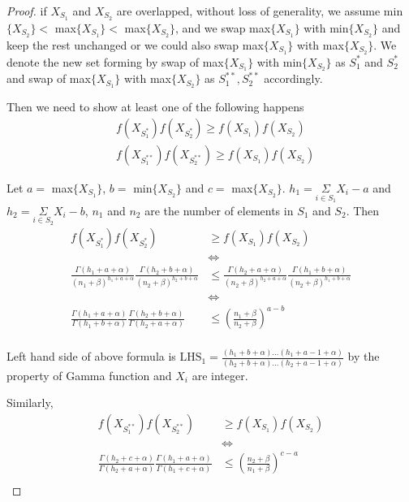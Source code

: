 \documentclass[aoas,preprint]{imsart}
\begin{document}
\begin{proof}
if $X_{S_1}$ and $X_{S_2}$ are overlapped, without loss of generality, we assume min$\{X_{S_2}\}  <$ max$\{X_{S_1}\}  <$ max$\{X_{S_2}\}$, and we swap max$\{X_{S_1}\}$ with min$\{X_{S_2}\}$ and keep the rest unchanged or we could also swap max$\{X_{S_1}\}$ with max$\{X_{S_2}\}$. We denote the new set forming by swap of max$\{X_{S_1}\}$ with min$\{X_{S_2}\}$  as $S_1^*$ and $S_2^*$ and swap of max$\{X_{S_1}\}$ with max$\{X_{S_2}\}$ as $S_1^{**}, S_2^{**}$ accordingly.

Then we need to show  at least one of the following happens
\begin{align}
&f(X_{S_1^*}) f(X_{S_2^*}) \geq f(X_{S_1}) f(X_{S_2})\\
&f(X_{S_1^{**}}) f(X_{S_2^{**}}) \geq f(X_{S_1}) f(X_{S_2})
\end{align}


Let $a =$ max$\{X_{S_1}\}$, $b = $ min$\{X_{S_2}\}$ and $c = $ max$\{X_{S_2}\}$. $h_1 = \underset{i \in S_1}{\Sigma} X_i - a$ and $h_2 = \underset{i \in S_2}{\Sigma} X_i - b$, $n_1$ and $n_2$ are the number of elements in $S_1$ and $S_2$. Then
\begin{align*}
f(X_{S_1^*}) f(X_{S_2^*}) &\geq f(X_{S_1}) f(X_{S_2})\\
&\iff\\
\frac{\Gamma(h_1 + a + \alpha)}{(n_1 + \beta)^{h_1 + a +\alpha}} \frac{\Gamma(h_2 + b + \alpha)}{(n_2 + \beta)^{h_2 + b + \alpha}} &\leq \frac{\Gamma(h_2 + a + \alpha)}{(n_2 + \beta)^{h_2+ a +\alpha}} \frac{\Gamma(h_1 + b + \alpha)}{(n_2 + \beta)^{h_1 + b + \alpha}}\\
&\iff\\
\frac{\Gamma(h_1 + a + \alpha)}{\Gamma(h_1 + b + \alpha)} \frac{\Gamma(h_2 + b + \alpha)}{\Gamma(h_2 + a + \alpha)} &\leq (\frac{n_1 + \beta}{n_2 + \beta})^{a - b} \\
\end{align*}


Left hand side of above formula is $\text{LHS}_1 = \frac{(h_1 + b + \alpha)...(h_1 + a - 1 + \alpha)}{(h_2 + b + \alpha) ... (h_2 + a - 1 + \alpha)}$ by the property of Gamma function and $X_i$ are integer.

Similarly,
\begin{align*}
f(X_{S_1^{**}}) f(X_{S_2^{**}}) &\geq f(X_{S_1}) f(X_{S_2})\\
&\iff\\
\frac{\Gamma(h_2 + c + \alpha)}{\Gamma(h_2 + a + \alpha)} \frac{\Gamma(h_1 + a + \alpha)}{\Gamma(h_1 + c + \alpha)} &\leq (\frac{n_2 + \beta}{n_1 + \beta})^{c - a} \\
\end{align*}


\end{proof}
\end{document}
